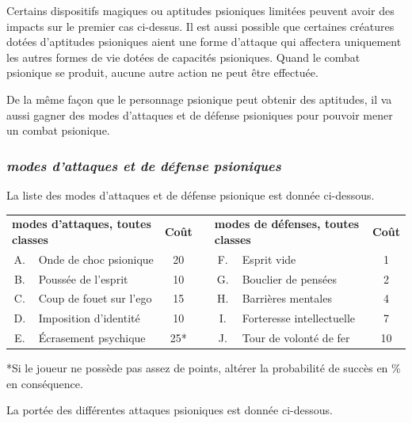 \documentclass[11pt]{article}
\begin{document}
{\bigskip

Certains dispositifs magiques ou aptitudes psioniques limitées peuvent avoir des impacts sur le premier cas ci-dessus. Il est aussi possible que certaines créatures dotées d'aptitudes psioniques aient une forme d'attaque qui affectera uniquement les autres formes de vie dotées de capacités psioniques. Quand le combat psionique se produit, aucune autre action ne peut être effectuée.

\bigskip

De la même façon que le personnage psionique peut obtenir des aptitudes, il va aussi gagner des modes d'attaques et de défense psioniques pour pouvoir mener un combat psionique.

\subsubsection*{\textit{modes d'attaques et de défense psioniques}}

La liste des modes d'attaques et de défense psionique est donnée ci-dessous.

\bigskip

\begin{tabular}{clccclc}
\multicolumn{2}{l}{\textbf{modes d'attaques, toutes classes}} & \textbf{Coût} && \multicolumn{2}{l}{\textbf{modes de défenses, toutes classes}} & \textbf{Coût} \\
A. & Onde de choc psionique   & 20  && F. & Esprit vide  & 1 \\
B. & Poussée de l'esprit  	  & 10  && G. & Bouclier de pensées  & 2 \\
C. & Coup de fouet sur l'ego  & 15  && H. & Barrières mentales & 4 \\
D. & Imposition d'identité    & 10  && I. & Forteresse intellectuelle  & 7 \\
E. & Écrasement psychique     & 25* && J. & Tour de volonté de fer  & 10 \\
\end{tabular}

\bigskip

*Si le joueur ne possède pas assez de points, altérer la probabilité de succès en \% en conséquence.

\bigskip

La portée des différentes attaques psioniques est donnée ci-dessous.

}
\end{document}
